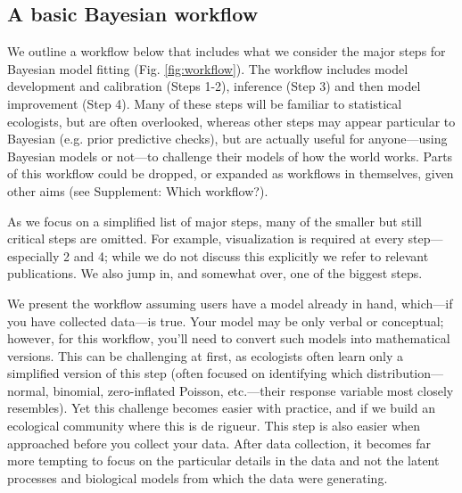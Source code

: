 \documentclass[11pt]{article}
\begin{document}
{\subsection*{A basic Bayesian workflow}
We outline a workflow below that includes what we consider the major steps for Bayesian model fitting (Fig. \ref{fig:workflow}). The workflow includes model development and calibration (Steps 1-2), inference (Step 3) and then model improvement (Step 4). Many of these steps will be familiar to statistical ecologists, but are often overlooked, whereas other steps may appear particular to Bayesian (e.g. prior predictive checks), but are actually useful for anyone---using Bayesian models or not---to challenge their models of how the world works. Parts of this workflow could be dropped, or expanded as workflows in themselves, given other aims (see Supplement: Which workflow?). 

As we focus on a simplified list of major steps, many of the smaller but still critical steps are omitted. For example, visualization is required at every step---especially 2 and 4; while we do not discuss this explicitly we refer to relevant publications. We also jump in, and somewhat over, one of the biggest steps. 

We present the workflow assuming users have a model already in hand, which---if you have collected data---is true. Your model may be only verbal or conceptual; however, for this workflow, you’ll need to convert such models into mathematical versions. This can be challenging at first, as ecologists often learn only a simplified version of this step (often focused on identifying which distribution---normal, binomial, zero-inflated Poisson, etc.---their response variable most closely resembles). Yet this challenge becomes easier with practice, and if we build an ecological community where this is de rigueur. This step is also easier when approached before you collect your data. After data collection, it becomes far more tempting to focus on the particular details in the data and not the latent processes and biological models from which the data were generating.

}
\end{document}
